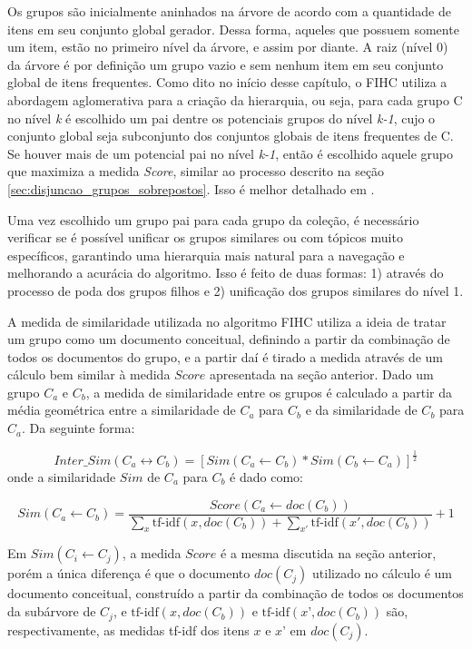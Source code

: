 \documentclass[a4paper,12pt]{article}
\begin{document}
Os grupos são inicialmente aninhados na árvore de acordo com a quantidade de itens em seu conjunto global gerador. Dessa forma, aqueles que possuem somente um item, estão no primeiro nível da árvore, e assim por diante. A raiz (nível 0) da árvore é por definição um grupo vazio e sem nenhum item em seu conjunto global de itens frequentes. Como dito no início desse capítulo, o FIHC utiliza a abordagem aglomerativa para a criação da hierarquia, ou seja, para cada grupo C no nível \emph{k} é escolhido um pai dentre os potenciais grupos do nível \emph{k-1}, cujo o conjunto global seja subconjunto dos conjuntos globais de itens frequentes de C. Se houver mais de um potencial pai no nível \emph{k-1}, então é escolhido aquele grupo que maximiza a medida \emph{Score}, similar ao processo descrito na seção \ref{sec:disjuncao_grupos_sobrepostos}. Isso é melhor detalhado em \cite{Ester03}.

Uma vez escolhido um grupo pai para cada grupo da coleção, é necessário verificar se é possível unificar os grupos similares ou com tópicos muito específicos, garantindo uma hierarquia mais natural para a navegação e melhorando a acurácia do algoritmo. Isso é feito de duas formas: 1) através do processo de poda dos grupos filhos e 2) unificação dos grupos similares do nível 1.

A medida de similaridade utilizada no algoritmo FIHC utiliza a ideia de tratar um grupo como um documento conceitual, definindo a partir da combinação de todos os documentos do grupo, e a partir daí é tirado a medida através de um cálculo bem similar à medida $Score$ apresentada na seção anterior. Dado um grupo $C_{a}$ e $C_{b}$, a medida de similaridade entre os grupos é calculado a partir da média geométrica entre a similaridade de $C_{a}$ para $C_{b}$ e da similaridade de $C_{b}$ para $C_{a}$. Da seguinte forma:

\begin{equation}
  Inter\_Sim(C_{a} \leftrightarrow C_{b}) = [Sim(C_{a} \gets C_{b}) * Sim(C_{b} \gets C_{a})]^\frac{1} {2}
\end{equation}
onde a similaridade $Sim$ de $C_{a}$ para $C_{b}$ é dado como:

\begin{equation}
  Sim(C_{a} \gets C_{b}) = \frac{ Score(C_{a} \gets doc(C_{b})) }{ \sum_{x}\mbox{tf-idf}(x,doc(C_{b})) + \sum_{x'}\mbox{tf-idf}(x',doc(C_{b})) } + 1
\end{equation}

Em $Sim(C_{i} \gets C_{j})$, a medida $Score$ é a mesma discutida na seção anterior, porém a única diferença é que o documento $doc(C_{j})$ utilizado no cálculo é um documento conceitual, construído a partir da combinação de todos os documentos da subárvore de $C_{j}$, e $\mbox{tf-idf}(x, doc(C_{b}))$ e $\mbox{tf-idf}(x’, doc(C_{b}))$ são, respectivamente, as medidas tf-idf dos itens $x$ e $x’$ em $doc(C_{j})$.
\end{document}
